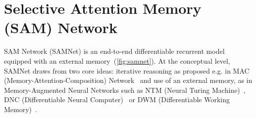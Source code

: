 \section{Selective Attention Memory (SAM) Network}



SAM Network (SAMNet) is an end-to-end differentiable recurrent model equipped with an external memory~(\cref{fig:samnet}). At the conceptual level, SAMNet draws from two core ideas:
iterative reasoning as proposed e.g. in MAC (Memory-Attention-Composition) Network~\cite{hudson2018compositional,marois2018transfer} and use of an external memory, as in Memory-Augmented Neural Networks such as NTM (Neural Turing Machine)~\cite{graves2014neural}, DNC (Differentiable Neural Computer)~\cite{graves2016hybrid} or DWM (Differentiable Working Memory)~\cite{jayram2018learning}.


